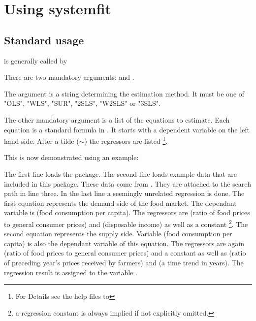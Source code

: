 \section{Using systemfit}\label{sec:Usage}


\subsection{Standard usage}

 is generally called by


There are two mandatory arguments:  and .

The argument  is a string determining the estimation method.
It must be one of "OLS", "WLS", "SUR", "2SLS", "W2SLS" or "3SLS".

The other mandatory argument  is a list of the equations 
to estimate. 
Each equation is a standard formula in .
It starts with a dependent variable on the left hand side.
After a tilde ($\sim$) the regressors are listed%
\footnote{For Details see the  help files to }.

This is now demonstrated using an example: \\

The first line loads the  package. 
The second line loads example data that are included in this package.
These data come from \cite{kmenta86}.
They are attached to the  search path in line three.
In the last line a seemingly unrelated regression is done.
The first equation represents the demand side of the food market.
The dependant variable is  (food consumption per capita). 
The regressors are  (ratio of food prices to general consumer prices)
and  (disposable income) as well as a constant%
\footnote{a regression constant is always implied if not explicitly omitted.}.
The second equation represents the supply side.
Variable  (food consumption per capita) is also the dependant 
variable of this equation. 
The regressors are again  (ratio of food prices to general 
consumer prices) and a constant as well as 
 (ratio of preceding year's prices received by farmers) and 
 (a time trend in years).
The regression result is assigned to the variable .

